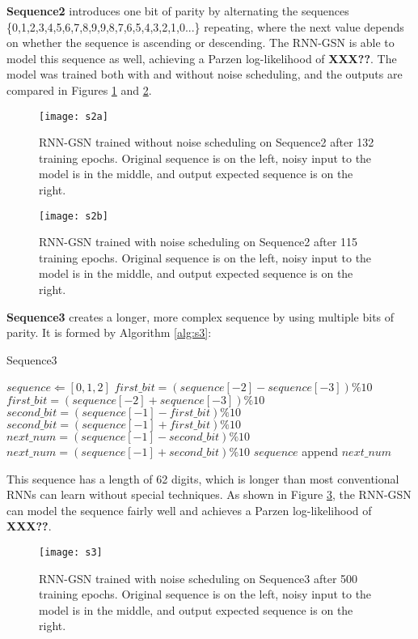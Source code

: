 \textbf{Sequence2} introduces one bit of parity by alternating the sequences \{0,1,2,3,4,5,6,7,8,9,9,8,7,6,5,4,3,2,1,0...\} repeating, where the next value depends on whether the sequence is ascending or descending. The RNN-GSN is able to model this sequence as well, achieving a Parzen log-likelihood of \textbf{XXX??}. The model was trained both with and without noise scheduling, and the outputs are compared in Figures \ref{fig:s2a} and \ref{fig:s2b}.
\begin{figure}[h!]
  \centering
    \texttt{[image: s2a]}
\caption{RNN-GSN trained without noise scheduling on Sequence2 after 132 training epochs. Original sequence is on the left, noisy input to the model is in the middle, and output expected sequence is on the right.}\label{fig:s2a}
\end{figure}
\begin{figure}[h!]
  \centering
    \texttt{[image: s2b]}
\caption{RNN-GSN trained with noise scheduling on Sequence2 after 115 training epochs. Original sequence is on the left, noisy input to the model is in the middle, and output expected sequence is on the right.}\label{fig:s2b}
\end{figure}


\textbf{Sequence3} creates a longer, more complex sequence by using multiple bits of parity. It is formed by Algorithm \ref{alg:s3}:
\begin{algorithm}
\caption{Sequence3}\label{alg:s3}
\begin{algorithmic}
	\STATE $sequence \Leftarrow [0,1,2]$
			\STATE $first\_bit = (sequence[-2] - sequence[-3])\%10$
		\ELSE
			\STATE $first\_bit = (sequence[-2] + sequence[-3])\%10$
		\ENDIF
			\STATE $second\_bit = (sequence[-1] - first\_bit)\%10$
		\ELSE
			\STATE $second\_bit = (sequence[-1] + first\_bit)\%10$
		\ENDIF
			\STATE $next\_num = (sequence[-1] - second\_bit)\%10$
		\ELSE
			\STATE $next\_num = (sequence[-1] + second\_bit)\%10$
		\ENDIF
		\STATE $sequence$ append $next\_num$
	\ENDWHILE
\end{algorithmic}
\end{algorithm}
This sequence has a length of 62 digits, which is longer than most conventional RNNs can learn without special techniques. As shown in Figure \ref{fig:s3}, the RNN-GSN can model the sequence fairly well and achieves a Parzen log-likelihood of \textbf{XXX??}.
\begin{figure}[h!]
  \centering
    \texttt{[image: s3]}
\caption{RNN-GSN trained with noise scheduling on Sequence3 after 500 training epochs. Original sequence is on the left, noisy input to the model is in the middle, and output expected sequence is on the right.}\label{fig:s3}
\end{figure}

